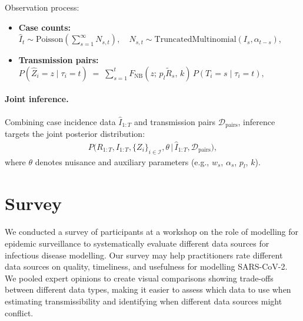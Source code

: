 \documentclass{article}
\begin{document}
Observation process:
\begin{itemize}
    \item \textbf{Case counts:} $\widehat{I}_t \sim \mathrm{Poisson}\left(\sum_{s=1}^\infty N_{s,t}\right), \quad N_{s,t} \sim \mathrm{TruncatedMultinomial}(I_s, \alpha_{t-s})$,

    \item \textbf{Transmission pairs:} $P(\widehat{Z}_i=z \mid \tau_i=t) \;=\; \sum_{s=1}^{t} F_{\mathrm{NB}}\!\left(z;\, p_l \tilde{R}_s,\, k\right) \, P(T_i=s \mid \tau_i=t),$
\end{itemize}

\paragraph{Joint inference.}
Combining case incidence data $\widehat{I}_{1:T}$ and transmission pairs $\mathcal{D}_{\mathrm{pairs}}$, inference targets the joint posterior distribution:
\begin{align}
P\big(R_{1:T}, I_{1:T}, \{Z_i\}_{i\in\mathcal{I}}, \theta \,\big|\, \widehat{I}_{1:T}, \mathcal{D}_{\mathrm{pairs}}\big),
\end{align}
where $\theta$ denotes nuisance and auxiliary parameters (e.g., $w_s$, $\alpha_s$, $p_l$, $k$).  


\newpage

\section{Survey}
\paragraph{}We conducted a survey of participants at a workshop on the role of modelling for epidemic surveillance to systematically evaluate different data sources for infectious disease modelling.
Our survey may help practitioners rate different data sources on quality, timeliness, and usefulness for modelling SARS-CoV-2. We pooled expert opinions to create visual comparisons showing trade-offs between different data types, making it easier to assess which data to use when estimating transmissibility and identifying when different data sources might conflict.
\end{document}
